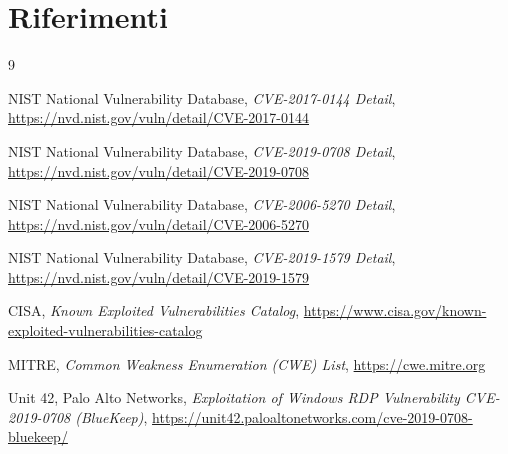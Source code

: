 \documentclass[11pt,a4paper]{article}
\begin{document}
\section*{Riferimenti}

\begin{thebibliography}{9}

 NIST National Vulnerability Database, \textit{CVE-2017-0144 Detail}, \url{https://nvd.nist.gov/vuln/detail/CVE-2017-0144}

 NIST National Vulnerability Database, \textit{CVE-2019-0708 Detail}, \url{https://nvd.nist.gov/vuln/detail/CVE-2019-0708}

 NIST National Vulnerability Database, \textit{CVE-2006-5270 Detail}, \url{https://nvd.nist.gov/vuln/detail/CVE-2006-5270}

 NIST National Vulnerability Database, \textit{CVE-2019-1579 Detail}, \url{https://nvd.nist.gov/vuln/detail/CVE-2019-1579}

 CISA, \textit{Known Exploited Vulnerabilities Catalog}, \url{https://www.cisa.gov/known-exploited-vulnerabilities-catalog}

 MITRE, \textit{Common Weakness Enumeration (CWE) List}, \url{https://cwe.mitre.org}

 Unit 42, Palo Alto Networks, \textit{Exploitation of Windows RDP Vulnerability CVE-2019-0708 (BlueKeep)}, \url{https://unit42.paloaltonetworks.com/cve-2019-0708-bluekeep/}

\end{thebibliography}
\end{document}
